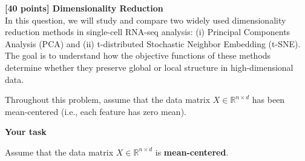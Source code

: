 {\bf [40 points] Dimensionality Reduction}\\

In this question, we will study and compare two widely used dimensionality reduction methods
in single-cell RNA-seq analysis: (i) Principal Components Analysis (PCA) and
(ii) t-distributed Stochastic Neighbor Embedding (t-SNE).
The goal is to understand how the objective functions of these methods determine whether
they preserve global or local structure in high-dimensional data.

\vspace{10pt}

Throughout this problem, assume that the data matrix
$X \in \mathbb{R}^{n \times d}$ has been mean-centered
(i.e., each feature has zero mean).


\vspace{10pt}
\textbf{Your task}
\vspace{10pt}




Assume that the data matrix
$X \in \mathbb{R}^{n \times d}$ is \textbf{mean-centered}.

